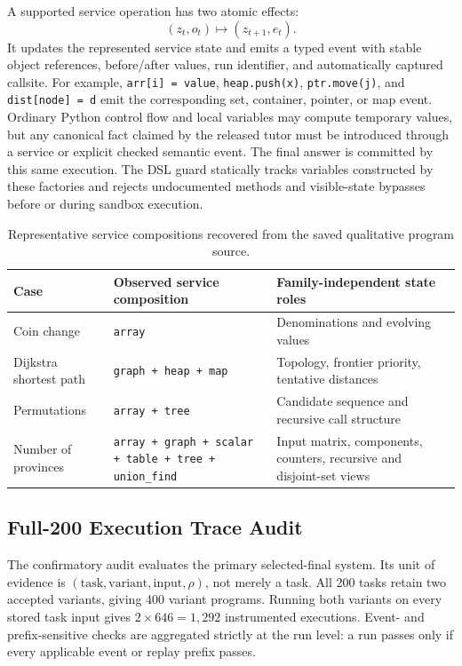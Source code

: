 \documentclass[letterpaper]{article}
\begin{document}
A supported service operation has two atomic effects:
\[
(z_t,o_t)\longmapsto(z_{t+1},e_t).
\]
It updates the represented service state and emits a typed event with stable object references, before/after values, run identifier, and automatically captured callsite. For example, \texttt{arr[i] = value}, \texttt{heap.push(x)}, \texttt{ptr.move(j)}, and \texttt{dist[node] = d} emit the corresponding set, container, pointer, or map event. Ordinary Python control flow and local variables may compute temporary values, but any canonical fact claimed by the released tutor must be introduced through a service or explicit checked semantic event. The final answer is committed by this same execution. The DSL guard statically tracks variables constructed by these factories and rejects undocumented methods and visible-state bypasses before or during sandbox execution.

\begin{table}[t]
\centering
\small
\begin{tabular}{@{}p{}p{}p{}@{}}
\toprule
Case & Observed service composition & Family-independent state roles \\
\midrule
Coin change & \texttt{array} & Denominations and evolving values \\
Dijkstra shortest path & \texttt{graph + heap + map} & Topology, frontier priority, tentative distances \\
Permutations & \texttt{array + tree} & Candidate sequence and recursive call structure \\
Number of provinces & \texttt{array + graph + scalar + table + tree + union\_find} & Input matrix, components, counters, recursive and disjoint-set views \\
\bottomrule
\end{tabular}
\caption{Representative service compositions recovered from the saved qualitative program source.}
\label{tab:service-examples}
\end{table}

\subsection{Full-200 Execution Trace Audit}
\label{sec:single-execution-audit}

The confirmatory audit evaluates the primary selected-final system. Its
unit of evidence is $(\text{task},\text{variant},\text{input},\rho)$,
not merely a task. All 200 tasks retain two accepted variants, giving
400 variant programs. Running both variants on every stored task input
gives $2\times646=1{,}292$ instrumented executions. Event- and
prefix-sensitive checks are aggregated strictly at the run level: a
run passes only if every applicable event or replay prefix passes.
\end{document}
